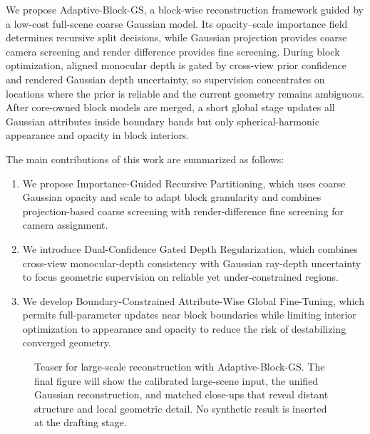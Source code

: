 \documentclass[conference]{IEEEtran}
\newcommand{\method}{Adaptive-Block-GS}
\begin{document}
We propose \method, a block-wise reconstruction framework guided by a low-cost full-scene coarse Gaussian model. Its opacity--scale importance field determines recursive split decisions, while Gaussian projection provides coarse camera screening and render difference provides fine screening. During block optimization, aligned monocular depth is gated by cross-view prior confidence and rendered Gaussian depth uncertainty, so supervision concentrates on locations where the prior is reliable and the current geometry remains ambiguous. After core-owned block models are merged, a short global stage updates all Gaussian attributes inside boundary bands but only spherical-harmonic appearance and opacity in block interiors.

The main contributions of this work are summarized as follows:
\begin{enumerate}
    \item We propose Importance-Guided Recursive Partitioning, which uses coarse Gaussian opacity and scale to adapt block granularity and combines projection-based coarse screening with render-difference fine screening for camera assignment.
    \item We introduce Dual-Confidence Gated Depth Regularization, which combines cross-view monocular-depth consistency with Gaussian ray-depth uncertainty to focus geometric supervision on reliable yet under-constrained regions.
    \item We develop Boundary-Constrained Attribute-Wise Global Fine-Tuning, which permits full-parameter updates near block boundaries while limiting interior optimization to appearance and opacity to reduce the risk of destabilizing converged geometry.
\end{enumerate}

\begin{figure}[t]
    \centering
    \caption{Teaser for large-scale reconstruction with \method. The final figure will show the calibrated large-scene input, the unified Gaussian reconstruction, and matched close-ups that reveal distant structure and local geometric detail. No synthetic result is inserted at the drafting stage.}
    \label{fig:teaser}
\end{figure}
\end{document}
